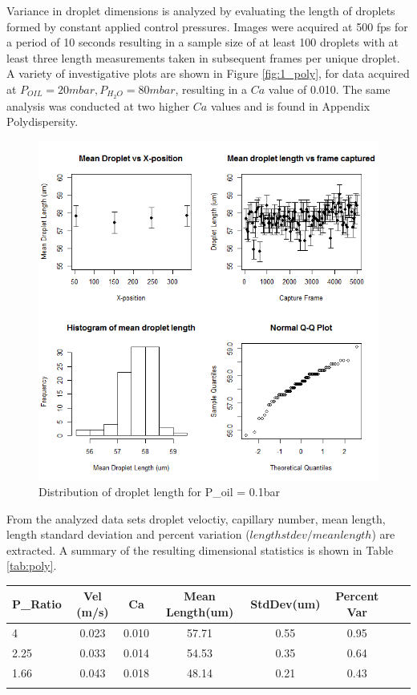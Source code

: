 Variance in droplet dimensions is analyzed by evaluating the length of droplets formed by constant applied control pressures. Images were acquired at 500 fps for a period of 10 seconds resulting in a sample size of at least 100 droplets with at least three length measurements taken in subsequent frames per unique droplet. A variety
 of investigative plots are shown in Figure \vref{fig:1_poly}, for data acquired at $P_{OIL} = 20mbar,  P_{H_2O} = 80mbar$, resulting in a $Ca$ value of 0.010. The same analysis was conducted at two higher $Ca$ values and is found in Appendix Polydispersity.

\begin{figure}[H]
\centering 
\includegraphics[width=01.0\columnwidth]{1_poly.PNG} 
\caption[Polydispersity]{Distribution of droplet length for P_oil = 0.1bar} 
\label{fig:1_poly} 
\end{figure}


\clearpage

From the analyzed data sets droplet veloctiy, capillary number, mean length, length standard deviation and percent variation ($length stdev / mean length$) are extracted. A summary of the resulting dimensional statistics is shown in Table \vref{tab:poly}.

\qquad

\begin{tabular}{l*{6}{c}r}
P_{Ratio} & Vel (m/s) & Ca & Mean Length(um) & StdDev(um) & Percent Var \\
\hline
4 & 0.023 & 0.010 & 57.71 & 0.55 & 0.95 \\
2.25 & 0.033 & 0.014 & 54.53 & 0.35 &  0.64 \\
1.66 & 0.043 & 0.018 & 48.14 & 0.21 &  0.43 \\
\caption[Droplet Polydispersity]{Dimensional analysis of droplets}
\label{tab:poly} 
\end{tabular}


